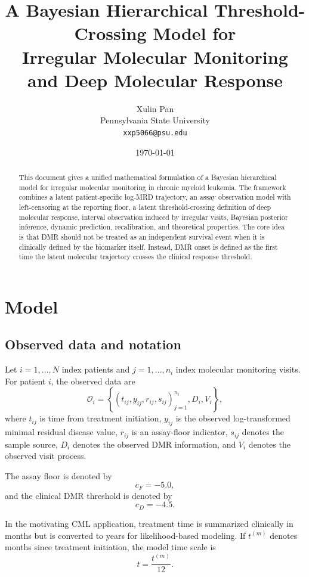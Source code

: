 \documentclass[11pt]{article}
\title{
A Bayesian Hierarchical Threshold-Crossing Model for\\
Irregular Molecular Monitoring and Deep Molecular Response
}
\author{
Xulin Pan\\
Pennsylvania State University\\
\texttt{xxp5066@psu.edu}
}
\date{\today}
\theoremstyle{remark}
\begin{document}
\maketitle

\begin{abstract}
This document gives a unified mathematical formulation of a Bayesian hierarchical model for irregular molecular monitoring in chronic myeloid leukemia. The framework combines a latent patient-specific log-MRD trajectory, an assay observation model with left-censoring at the reporting floor, a latent threshold-crossing definition of deep molecular response, interval observation induced by irregular visits, Bayesian posterior inference, dynamic prediction, recalibration, and theoretical properties. The core idea is that DMR should not be treated as an independent survival event when it is clinically defined by the biomarker itself. Instead, DMR onset is defined as the first time the latent molecular trajectory crosses the clinical response threshold.
\end{abstract}

\tableofcontents

\section{Model}

\subsection{Observed data and notation}

Let \(i=1,\ldots,N\) index patients and \(j=1,\ldots,n_i\) index molecular monitoring visits. For patient \(i\), the observed data are
\[
\mathcal{O}_i
=
\left\{
(t_{ij},y_{ij},r_{ij},s_{ij})_{j=1}^{n_i},
D_i,
V_i
\right\},
\]
where \(t_{ij}\) is time from treatment initiation, \(y_{ij}\) is the observed log-transformed minimal residual disease value, \(r_{ij}\) is an assay-floor indicator, \(s_{ij}\) denotes the sample source, \(D_i\) denotes the observed DMR information, and \(V_i\) denotes the observed visit process.

The assay floor is denoted by
\[
c_F=-5.0,
\]
and the clinical DMR threshold is denoted by
\[
c_D=-4.5.
\]

In the motivating CML application, treatment time is summarized clinically in months but is converted to years for likelihood-based modeling. If \(t^{(m)}\) denotes months since treatment initiation, the model time scale is
\[
t=\frac{t^{(m)}}{12}.
\]
\end{document}
